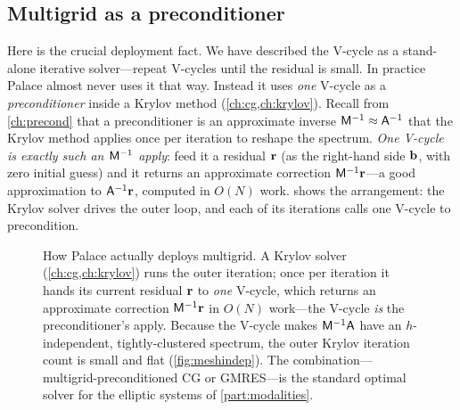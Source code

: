 \subsection{Multigrid as a preconditioner}

Here is the crucial deployment fact. We have described the V-cycle as a stand-alone iterative
solver---repeat V-cycles until the residual is small. In practice Palace almost never uses it
that way. Instead it uses \emph{one} V-cycle as a \emph{preconditioner} inside a Krylov method
(\cref{ch:cg,ch:krylov}). Recall from \cref{ch:precond} that a preconditioner is an
approximate inverse $\mathsf{M}^{-1}\approx\mathsf{A}^{-1}$ that the Krylov method applies once per
iteration to reshape the spectrum. \emph{One V-cycle is exactly such an $\mathsf{M}^{-1}$ apply}:
feed it a residual $\mathbf{r}$ (as the right-hand side $\mathbf{b}$, with zero initial guess) and it returns
an approximate correction $\mathsf{M}^{-1}\mathbf{r}$---a good approximation to $\mathsf{A}^{-1}\mathbf{r}$,
computed in $O(N)$ work.  shows the arrangement: the Krylov solver drives
the outer loop, and each of its iterations calls one V-cycle to precondition.

\begin{figure}[t]
\centering
{}
\caption[Multigrid as a preconditioner]{How Palace actually deploys multigrid. A Krylov solver
(\cref{ch:cg,ch:krylov}) runs the outer iteration; once per iteration it hands its current
residual $\mathbf{r}$ to \emph{one} V-cycle, which returns an approximate correction $\mathsf{M}^{-1}\mathbf{r}$
in $O(N)$ work---the V-cycle \emph{is} the preconditioner's apply. Because the V-cycle makes
$\mathsf{M}^{-1}\mathsf{A}$ have an $h$-independent, tightly-clustered spectrum, the outer Krylov
iteration count is small and flat (\cref{fig:meshindep}). The combination---multigrid-preconditioned
CG or GMRES---is the standard optimal solver for the elliptic systems of \cref{part:modalities}.}
\label{fig:mgprecond}
\end{figure}

